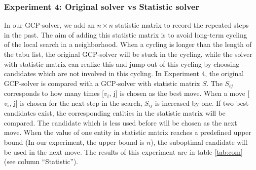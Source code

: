 \documentclass[12pt,a4paper,twoside]{scrartcl}
\numberwithin{equation}{section}
\begin{document}
\subsubsection{Experiment 4: Original solver vs Statistic solver}
\label{sec:Experiment 4}
In our GCP-solver, we add an $n\times n$ statistic matrix to record the repeated steps in the past. The aim of adding this statistic matrix is to avoid long-term cycling of the local search in a neighborhood. When a cycling is longer than the length of the tabu list, the original GCP-solver will be stuck in the cycling, while the solver with statistic matrix can realize this and jump out of this cycling by choosing candidates which are not involved in this cycling.
In Experiment 4, the original GCP-solver is compared with a GCP-solver with statistic matrix $S$. The $S_{ij}$ corresponds to how many times [$v_i$, j] is chosen as the best move. When a move [$v_i$, j] is chosen for the next step in the search, $S_{ij}$ is increased by one. If two best candidates exist, the corresponding entities in the statistic matrix will be compared. The candidate which is less used before will be chosen as the next move. When the value of one entity in statistic matrix reaches a predefined upper bound (In our experiment, the upper bound is $n$), the suboptimal candidate will be used in the next move. The results of this experiment are in table \ref{tab:com} (see column ``Statistic'').
\end{document}
